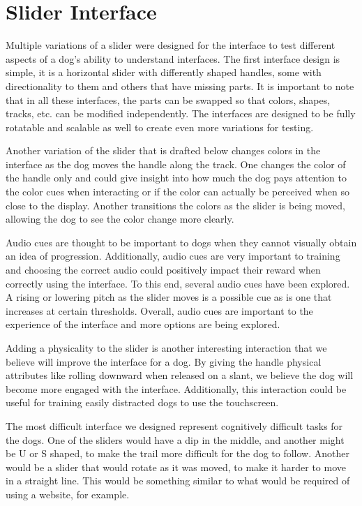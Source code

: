 \documentclass{sigchi}
\begin{document}
    \section{Slider Interface}
        Multiple variations of a slider were designed for the interface to test different aspects of a dog’s ability to understand interfaces. The first interface design is simple, it is a horizontal slider with differently shaped handles, some with directionality to them and others that have missing parts. It is important to note that in all these interfaces, the parts can be swapped so that colors, shapes, tracks, etc. can be modified independently. The interfaces are designed to be fully rotatable and scalable as well to create even more variations for testing.

        Another variation of the slider that is drafted below changes colors in the interface as the dog moves the handle along the track. One changes the color of the handle only and could give insight into how much the dog pays attention to the color cues when interacting or if the color can actually be perceived when so close to the display. Another transitions the colors as the slider is being moved, allowing the dog to see the color change more clearly.

        Audio cues are thought to be important to dogs when they cannot visually obtain an idea of progression. Additionally, audio cues are very important to training and choosing the correct audio could positively impact their reward when correctly using the interface. To this end, several audio cues have been explored. A rising or lowering pitch as the slider moves is a possible cue as is one that increases at certain thresholds. Overall, audio cues are important to the experience of the interface and more options are being explored.

        Adding a physicality to the slider is another interesting interaction that we believe will improve the interface for a dog. By giving the handle physical attributes like rolling downward when released on a slant, we believe the dog will become more engaged with the interface. Additionally, this interaction could be useful for training easily distracted dogs to use the touchscreen.

        The most difficult interface we designed represent cognitively difficult tasks for the dogs. One of the sliders would have a dip in the middle, and another might be U or S shaped, to make the trail more difficult for the dog to follow. Another would be a slider that would rotate as it was moved, to make it harder to move in a straight line. This would be something similar to what would be required of using a website, for example.
    
\end{document}
